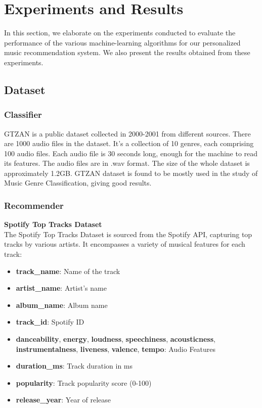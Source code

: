 \documentclass[a4paper, 24pt]{article}
\begin{document}
\section{Experiments and Results}
\label{sec:exp}
In this section, we elaborate on the experiments conducted to evaluate the performance of the various machine-learning algorithms for our personalized music recommendation system. We also present the results obtained from these experiments.
\subsection{Dataset}
\subsubsection{Classifier}
GTZAN is a public dataset collected in 2000-2001 from different sources. There are 1000 audio files in the dataset. It’s a collection of 10 genres, each comprising 100 audio files. Each audio file is 30 seconds long, enough for the machine to read its features. The audio files are in .wav format. The size of the whole dataset is approximately 1.2GB. GTZAN dataset is found to be mostly used in the study of Music Genre Classification, giving good results.
\subsubsection{Recommender}
\textbf{Spotify Top Tracks Dataset} \\
The Spotify Top Tracks Dataset is sourced from the Spotify API, capturing top tracks by various artists. It encompasses a variety of musical features for each track:
\begin{itemize}
    \item \textbf{track\_name}: Name of the track
    \item \textbf{artist\_name}: Artist's name
    \item \textbf{album\_name}: Album name
    \item \textbf{track\_id}: Spotify ID
    \item \textbf{danceability}, \textbf{energy}, \textbf{loudness}, \textbf{speechiness}, \textbf{acousticness}, \textbf{instrumentalness}, \textbf{liveness}, \textbf{valence}, \textbf{tempo}: Audio Features
    \item \textbf{duration\_ms}: Track duration in ms
    \item \textbf{popularity}: Track popularity score (0-100)
    \item \textbf{release\_year}: Year of release
\end{itemize}
\end{document}
